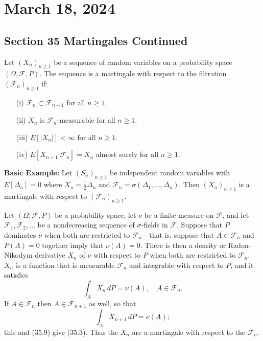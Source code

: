 \newpage
\section{March 18, 2024}
\subsection*{Section 35 Martingales Continued}

\begin{definition}
Let $(X_n)_{n \geq 1}$ be a sequence of random variables on a probability space $(\Omega, \mathcal{F}, P)$. The sequence is a martingale with respect to the filtration $(\mathcal{F}_n)_{n\geq 1}$ if:
\begin{itemize}
    \item[(i)] $\mathcal{F}_n \subset \mathcal{F}_{n+1}$ for all $n \geq 1$.
    \item[(ii)] $X_n$ is $\mathcal{F}_n$-measurable for all $n \geq 1$.
    \item[(iii)] $E[|X_n|] < \infty$ for all $n \geq 1$.
    \item[(iv)] $E[X_{n+1} | \mathcal{F}_n] = X_n$ almost surely for all $n \geq 1$.
\end{itemize}
\end{definition}

\textbf{Basic Example:} Let $(S_n)_{n\geq 1}$ be independent random variables with $E[\Delta_n] = 0$ where $X_n = \frac{1}{2} \Delta_n$ and $\mathcal{F}_n = \sigma(\Delta_1, \ldots, \Delta_n)$. Then $(X_n)_{n\geq 1}$ is a martingale with respect to $(\mathcal{F}_n)_{n\geq 1}$.
\begin{example}
Let \((\Omega, \mathcal{F}, P)\) be a probability space, let \(\nu\) be a finite measure on \(\mathcal{F}\), and let \(\mathcal{F}_1, \mathcal{F}_2, \ldots\) be a nondecreasing sequence of \(\sigma\)-fields in \(\mathcal{F}\). Suppose that \(P\) dominates \(\nu\) when both are restricted to \(\mathcal{F}_n\)---that is, suppose that \(A \in \mathcal{F}_n\) and \(P(A) = 0\) together imply that \(\nu(A) = 0\). There is then a density or Radon-Nikodym derivative \(X_n\) of \(\nu\) with respect to \(P\) when both are restricted to \(\mathcal{F}_n\). \(X_n\) is a function that is measurable \(\mathcal{F}_n\) and integrable with respect to \(P\), and it satisfies
\begin{equation}
    \int_A X_n \, dP = \nu(A), \quad A \in \mathcal{F}_n.
\end{equation}
If \(A \in \mathcal{F}_n\) then \(A \in \mathcal{F}_{n+1}\) as well, so that
\begin{equation}
    \int_A X_{n+1} \, dP = \nu(A);
\end{equation}
this and (35.9) give (35.3). Thus the \(X_n\) are a martingale with respect to the \(\mathcal{F}_n\).
\end{example}

